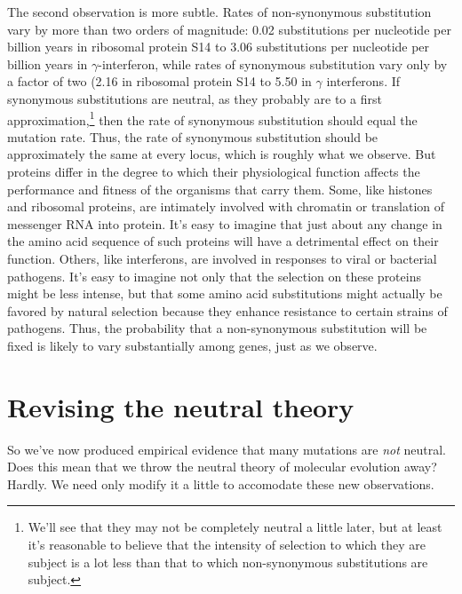 The second observation is more subtle. Rates of non-synonymous
substitution vary by more than two orders of magnitude: 0.02
substitutions per nucleotide per billion years in ribosomal protein
S14 to 3.06 substitutions per nucleotide per billion years in
$\gamma$-interferon, while rates of synonymous substitution vary only
by a factor of two (2.16 in ribosomal protein S14 to 5.50 in $\gamma$
interferons. If synonymous substitutions are neutral, as they probably
are to a first approximation,\footnote{We'll see that they may not be
  completely neutral a little later, but at least it's reasonable to
  believe that the intensity of selection to which they are subject is
  a lot less than that to which non-synonymous substitutions are
  subject.}  then the rate of synonymous substitution should equal the
mutation rate. Thus, the rate of synonymous substitution should be
approximately the same at every locus, which is roughly what we
observe. But proteins differ in the degree to which their
physiological function affects the performance and fitness of the
organisms that carry them. Some, like histones and ribosomal proteins,
are intimately involved with chromatin or translation of messenger RNA
into protein. It's easy to imagine that just about any change in the
amino acid sequence of such proteins will have a detrimental effect on
their function. Others, like interferons, are involved in responses to
viral or bacterial pathogens. It's easy to imagine not only that the
selection on these proteins might be less intense, but that some amino
acid substitutions might actually be favored by natural selection
because they enhance resistance to certain strains of pathogens. Thus,
the probability that a non-synonymous substitution will be fixed is
likely to vary substantially among genes, just as we observe.

\section*{Revising the neutral theory}

So we've now produced empirical evidence that many mutations are {\it
  not\/} neutral. Does this mean that we throw the neutral theory of
molecular evolution away? Hardly. We need only modify it a little to
accomodate these new observations.

